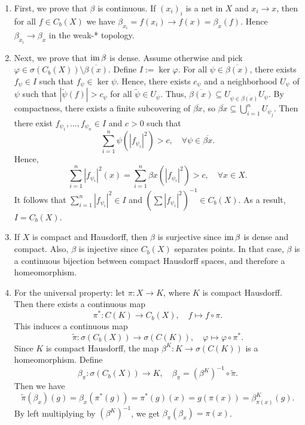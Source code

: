 \begin{myproof}
  \begin{enumerate}
    \item First, we prove that $\beta$ is continuous. If $(x_i)_i$ is a net in $X$ and $x_i \to x$,
    then for all $f \in C_b (X)$ we have $\beta_{x_i} = f(x_i) \to f(x) = \beta_x (f)$.
    Hence $\beta_{x_i} \to \beta_x$ in the weak-* topology.
    \item Next, we prove that $\operatorname{im} \beta$ is dense. Assume otherwise and pick $\varphi \in \sigma(C_b (X)) \setminus \overline{\beta (x)}$.
    Define $I := \ker \varphi$. For all $\psi \in \overline{\beta (x)}$, there exists $f_{\psi} \in I$ such that $f_{\psi} \in \ker \psi$.
    Hence, there exists $c_\psi$ and a neighborhood $U_{\psi}$ of $\psi$ such that $| \widetilde{\psi} (f)| > c_{\psi}$ for all $\widetilde{\psi} \in U_{\psi}$.
    Thus, $\overline{\beta (x)} \subseteq U_{\psi \in \overline{\beta (x)}} U_{\psi}$.
    By compactness, there exists a finite subcovering of $\overline{\beta x}$, so $\overline{\beta x} \subseteq \bigcup_{i = 1} ^n U_{\psi_j}$.
    Then there exist $f_{\psi_1}, \dots, f_{\psi_n} \in I$ and $c > 0$ such that 
    $$\sum_{i = 1} ^n \psi (|f_{\psi_i}|^2) > c,\quad \forall \psi \in \overline{\beta x}.$$
    Hence, $$\sum_{i = 1} ^n |f_{\psi_i}|^2 (x) = \sum_{i = 1} ^n \beta x (|f_{\psi_i}|^2) > c,\quad \forall x \in X.$$
    It follows that $\sum_{i = 1} ^n |f_{\psi_i} |^2 \in I$ and $(\sum |f_{\psi_i}|^2)^{-1} \in C_b (X)$. As a result, $I = C_b (X)$.
    \item If $X$ is compact and Hausdorff, then $\beta$ is surjective since $\operatorname{im} \beta$ is dense and compact.
    Also, $\beta$ is injective since $C_b (X)$ separates points. In that case, $\beta$ is a continuous bijection between compact Hausdorff spaces, and therefore a homeomorphism.
    \item For the universal property: let $\pi: X \to K$, where $K$ is compact Hausdorff.
    Then there exists a continuous map $$\pi^*: C(K) \rightarrow C_b (X),\quad f \mapsto f \circ \pi.$$
    This induces a continuous map 
    $$\widetilde{\pi}: \sigma(C_b (X)) \to \sigma (C(K)),\quad \varphi \mapsto \varphi \circ \pi^*.$$
    Since $K$ is compact Hausdorff, the map $\beta^K : K \to \sigma(C(K))$ is a homeomorphism.
    Define $$\beta_\pi: \sigma(C_b (X)) \to K,\quad \beta_{\pi} = (\beta^K)^{-1} \circ \widetilde{\pi}.$$
    Then we have 
    $$\widetilde{\pi} (\beta_x) (g) = \beta_x (\pi^* (g)) = \pi^* (g) (x) = g(\pi(x)) = \beta_{\pi(x)} ^K (g).$$
    By left multiplying by $(\beta^K)^{-1}$, we get $\beta_{\pi} (\beta_x) = \pi (x)$. \qedhere
  \end{enumerate}
\end{myproof}

